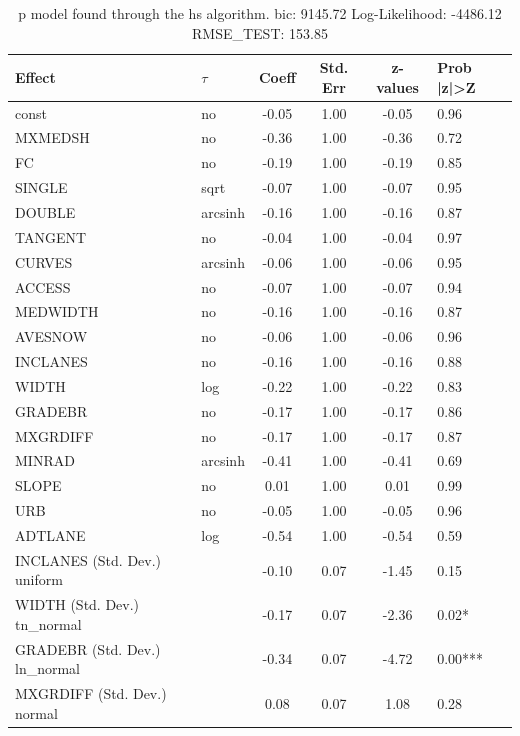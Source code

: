 \begin{table}
	\caption{p model found through the hs algorithm. bic: 9145.72 Log-Likelihood: -4486.12 RMSE_TEST: 153.85}
	\begin{center}
		\begin{tabular}{|l|l|c|c|c|l|}
			\hline
			Effect & $\tau$ & Coeff & Std. Err & z-values & Prob |z|>Z \\
			\hline
			const & no & -0.05 & 1.00 & -0.05 & 0.96 \\
			\hline
			MXMEDSH & no & -0.36 & 1.00 & -0.36 & 0.72 \\
			\hline
			FC & no & -0.19 & 1.00 & -0.19 & 0.85 \\
			\hline
			SINGLE & sqrt & -0.07 & 1.00 & -0.07 & 0.95 \\
			\hline
			DOUBLE & arcsinh & -0.16 & 1.00 & -0.16 & 0.87 \\
			\hline
			TANGENT & no & -0.04 & 1.00 & -0.04 & 0.97 \\
			\hline
			CURVES & arcsinh & -0.06 & 1.00 & -0.06 & 0.95 \\
			\hline
			ACCESS & no & -0.07 & 1.00 & -0.07 & 0.94 \\
			\hline
			MEDWIDTH & no & -0.16 & 1.00 & -0.16 & 0.87 \\
			\hline
			AVESNOW & no & -0.06 & 1.00 & -0.06 & 0.96 \\
			\hline
			INCLANES & no & -0.16 & 1.00 & -0.16 & 0.88 \\
			\hline
			WIDTH & log & -0.22 & 1.00 & -0.22 & 0.83 \\
			\hline
			GRADEBR & no & -0.17 & 1.00 & -0.17 & 0.86 \\
			\hline
			MXGRDIFF & no & -0.17 & 1.00 & -0.17 & 0.87 \\
			\hline
			MINRAD & arcsinh & -0.41 & 1.00 & -0.41 & 0.69 \\
			\hline
			SLOPE & no & 0.01 & 1.00 & 0.01 & 0.99 \\
			\hline
			URB & no & -0.05 & 1.00 & -0.05 & 0.96 \\
			\hline
			ADTLANE & log & -0.54 & 1.00 & -0.54 & 0.59 \\
			\hline
			INCLANES (Std. Dev.) uniform &  & -0.10 & 0.07 & -1.45 & 0.15 \\
			\hline
			WIDTH (Std. Dev.) tn_normal &  & -0.17 & 0.07 & -2.36 & 0.02* \\
			\hline
			GRADEBR (Std. Dev.) ln_normal &  & -0.34 & 0.07 & -4.72 & 0.00*** \\
			\hline
			MXGRDIFF (Std. Dev.) normal &  & 0.08 & 0.07 & 1.08 & 0.28 \\

\end{tabular}
\end{center}
\end{table}
